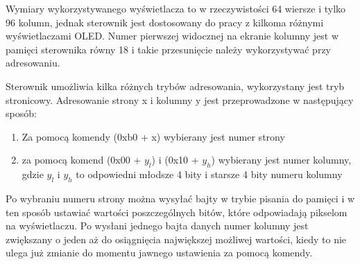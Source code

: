 Wymiary wykorzystywanego wyświetlacza to w rzeczywistości 64 wiersze i tylko 96 kolumn, jednak sterownik jest dostosowany do pracy z kilkoma różnymi wyświetlaczami OLED. Numer pierwszej widocznej na ekranie kolumny jest w pamięci sterownika równy 18 i takie przesunięcie należy wykorzystywać przy adresowaniu.

Sterownik umożliwia kilka różnych trybów adresowania, wykorzystany jest tryb stronicowy. Adresowanie strony x i kolumny y jest przeprowadzone w następujący sposób:
\begin{enumerate}
    \item Za pomocą komendy (0xb0 + x) wybierany jest numer strony
    \item za pomocą komend (0x00 + $y_l$) i (0x10 + $y_h$) wybierany jest numer kolumny, gdzie $y_l$ i $y_h$ to odpowiedni młodsze 4 bity i starsze 4 bity numeru kolumny
\end{enumerate}

Po wybraniu numeru strony można wysyłać bajty w trybie pisania do pamięci i w ten sposób ustawiać wartości poszczególnych bitów, które odpowiadają pikselom na wyświetlaczu. Po wysłani jednego bajta danych numer kolumny jest zwiększany o jeden aż do osiągnięcia największej możliwej wartości, kiedy to nie ulega już zmianie do momentu jawnego ustawienia za pomocą komendy.
